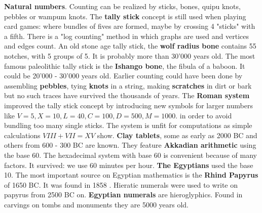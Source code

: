 \documentclass[12pt]{amsart}
\begin{document}
{\bf Natural numbers}. Counting can be realized by sticks, bones, quipu knots, pebbles or wampum knots.
The {\bf tally stick} concept is still used when playing card games: where bundles of fives are formed, maybe by 
crossing 4 "sticks" with a fifth. There is a "log counting" method in which graphs are used and vertices and edges count.
An old stone age tally stick, the {\bf wolf radius bone} contains 55 notches, with 5 groups of 5.
It is probably more than 30'000 years old.  \cite{SondheimerRogerson}
The most famous paleolithic tally stick is the 
{\bf Ishango bone}, the fibula of a baboon. It could be 20'000 - 30'000 years old. \cite{Eves} 
Earlier counting could have been done by assembling {\bf pebbles}, tying {\bf knots} in a string, making 
{\bf scratches} in dirt or bark but no such traces have survived the thousands of years. %
The {\bf Roman system} improved the tally stick concept by introducing new symbols for larger numbers like
$V=5,X=10,L=40,C=100,D=500,M=1000$. \label{Roman system}
in order to avoid bundling too many single sticks.
The system is unfit for computations as simple calculations $VIII + VII = XV$ show.
{\bf Clay tablets}, some as early as 2000 BC and others from 600 - 300 BC are known. They feature
{\bf Akkadian arithmetic} using the base 60. %
The hexadecimal system with base $60$ is convenient because of many factors. It survived: we use
$60$ minutes per hour. {\bf The Egyptians} used the base 10.  The most important source on Egyptian mathematics is the 
{\bf Rhind Papyrus} of 1650 BC.  It was found in 1858 \cite{Katz2007,SondheimerRogerson}. %
Hieratic numerals were used to write on papyrus from 2500 BC on.
{\bf Egyptian numerals} are hieroglyphics. Found in carvings on tombs and 
monuments they are 5000 years old. %
\end{document}
